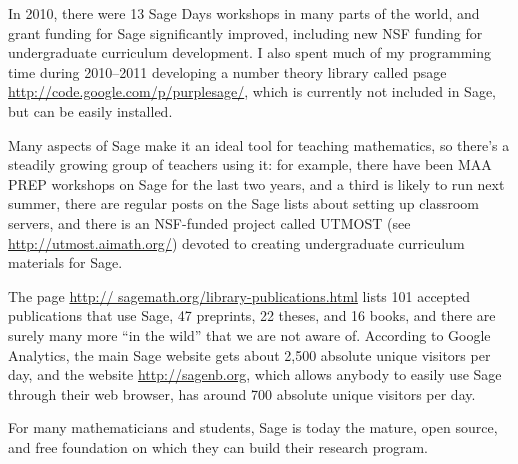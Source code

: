 \documentclass[multi]{cambridge7A}
\theoremstyle{plain}%
\theoremstyle{definition}
\begin{document}
In 2010, there were 13 Sage Days workshops in many parts of the world,
and grant funding for Sage significantly improved, including new NSF
funding for undergraduate curriculum development.  I also spent much
of my programming time during 2010--2011 developing a number theory
library called psage \url{http://code.google.com/p/purplesage/}, which
is currently not included in Sage, but can be easily installed.


Many aspects of Sage make it an ideal tool for teaching
mathematics, so there's a steadily growing group of teachers using it:
for example, there have been MAA PREP workshops on Sage for the last
two years, and a third is likely to run next summer, there are regular
posts on the Sage lists about setting up classroom servers, and there
is an NSF-funded project called UTMOST (see
\url{http://utmost.aimath.org/}) devoted to creating undergraduate
curriculum materials for Sage.

The page \url{http:// sagemath.org/library-publications.html} lists
101 accepted publications that use Sage, 47 preprints, 22 theses, and
16 books, and there are surely many more ``in the wild'' that we are
not aware of.  According to Google Analytics, the main Sage website
gets about 2,500 absolute unique visitors per day, and the website
\url{http://sagenb.org}, which allows anybody to easily use Sage
through their web browser, has around 700 absolute unique visitors per
day.


For many mathematicians and students, Sage is today the mature, open
source, and free foundation on which they can build their research
program.
\end{document}
